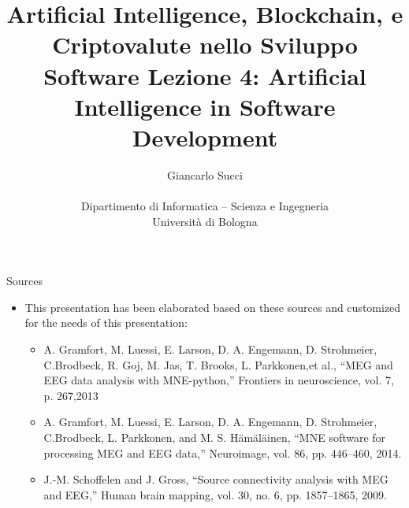 \documentclass{beamer}
\title[L01]{Artificial Intelligence, Blockchain, e Criptovalute nello Sviluppo Software \newline\newline
Lezione 4: Artificial Intelligence in Software Development} %
\author[{\tiny Giancarlo Succi }]{Giancarlo Succi\\\\ Dipartimento di Informatica -- Scienza e Ingegneria\\Universit\`{a} di Bologna\\
\bftt{g.succi@unibo.it}
} %
\institute[unibo] %
\date{} %
\begin{document}
\begin{frame}
\titlepage %

\end{frame}





\begin{frame}
{\centerline{Sources}}
\begin{itemize}
    \item This presentation has been elaborated  based on these sources and customized for the needs of this presentation:
    \begin{itemize}
        \item  A. Gramfort, M. Luessi, E. Larson, D. A. Engemann, D. Strohmeier, C.Brodbeck, R. Goj, M. Jas, T. Brooks, L. Parkkonen,et al., ``MEG and EEG data analysis with MNE-python,'' Frontiers in neuroscience, vol. 7, p. 267,2013
        \item A. Gramfort, M. Luessi, E. Larson, D. A. Engemann, D. Strohmeier, C.Brodbeck, L. Parkkonen, and M. S. H\"{a}m\"{a}l\"{a}inen, ``MNE software for processing MEG and EEG data,'' Neuroimage, vol. 86, pp. 446–460, 2014.
        \item J.-M. Schoffelen and J. Gross, ``Source connectivity analysis with MEG and EEG,'' Human brain mapping, vol. 30, no. 6, pp. 1857–1865, 2009.
    \end{itemize}
\end{itemize}
\end{frame}
\end{document}
